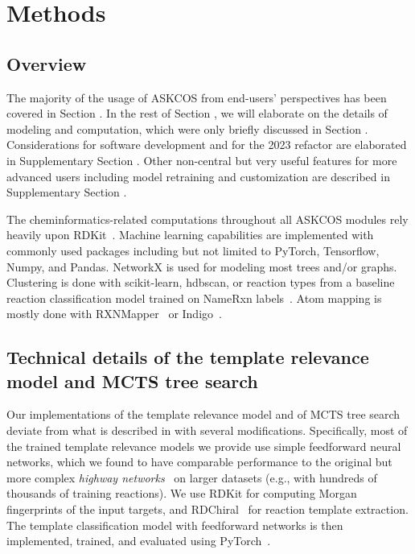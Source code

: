 \documentclass[pdflatex,sn-mathphys-num]{sn-jnl}%
\theoremstyle{thmstyleone}%
\theoremstyle{thmstyletwo}%
\theoremstyle{thmstylethree}%
\begin{document}
\section{Methods}\label{methods}

\subsection{Overview}

The majority of the usage of ASKCOS from end-users' perspectives has been covered in Section . In the rest of Section , we will elaborate on the details of modeling and computation, which were only briefly discussed in Section . Considerations for software development and for the 2023 refactor are elaborated in Supplementary Section . Other non-central but very useful features for more advanced users including model retraining and customization are described in Supplementary Section .

The cheminformatics-related computations throughout all ASKCOS modules rely heavily upon RDKit~\citep{RDKit}. Machine learning capabilities are implemented with commonly used packages including but not limited to PyTorch, Tensorflow, Numpy, and Pandas. NetworkX is used for modeling most trees and/or graphs. Clustering is done with scikit-learn, hdbscan, or reaction types from a baseline reaction classification model trained on NameRxn labels~\citep{NameRXN}. Atom mapping is mostly done with RXNMapper~\citep{schwaller_extraction_2021} or Indigo~\citep{Indigo}.

\subsection{Technical details of the template relevance model and MCTS tree search}

Our implementations of the template relevance model and of MCTS tree search deviate from what is described in \citet{segler_planning_2018} with several modifications. Specifically, most of the trained template relevance models we provide use simple feedforward neural networks, which we found to have comparable performance to the original but more complex \emph{highway networks}~\citep{srivastava_training_2015} on larger datasets (e.g., with hundreds of thousands of training reactions). We use RDKit for computing Morgan fingerprints of the input targets, and RDChiral~\citep{coley_rdchiral_2019} for reaction template extraction. The template classification model with feedforward networks is then implemented, trained, and evaluated using PyTorch~\citep{PyTorch}.
\end{document}

